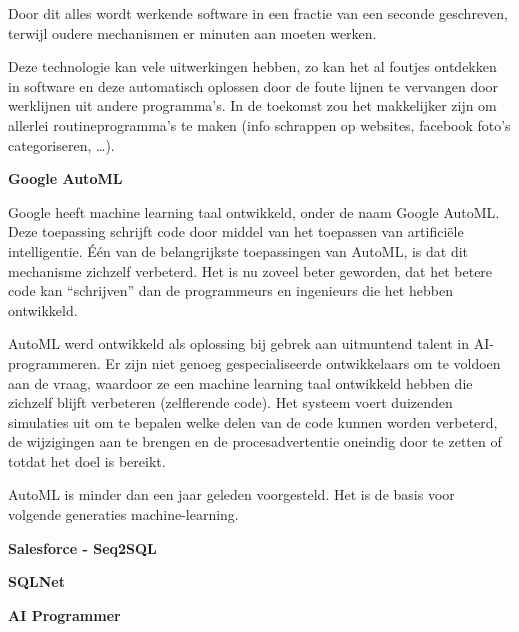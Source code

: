 Door dit alles wordt werkende software in een fractie van een seconde geschreven, terwijl oudere mechanismen er minuten aan moeten werken.

Deze technologie kan vele uitwerkingen hebben, zo kan het al foutjes ontdekken in software en deze automatisch oplossen door de foute lijnen te vervangen door werklijnen uit andere programma’s. In de toekomst zou het makkelijker zijn om allerlei routineprogramma’s te maken (info schrappen op websites, facebook foto’s categoriseren, …).

\textbf{Google AutoML}

Google heeft machine learning taal ontwikkeld, onder de naam Google AutoML. Deze toepassing schrijft code door middel van het toepassen van artificiële intelligentie. Één van de belangrijkste toepassingen van AutoML, is dat dit mechanisme zichzelf verbeterd. Het is nu zoveel beter geworden, dat het betere code kan “schrijven” dan de programmeurs en ingenieurs die het hebben ontwikkeld. 

AutoML werd ontwikkeld als oplossing bij gebrek aan uitmuntend talent in AI-programmeren. Er zijn niet genoeg gespecialiseerde ontwikkelaars om te voldoen aan de vraag, waardoor ze een machine learning taal ontwikkeld hebben die zichzelf blijft verbeteren (zelflerende code). Het systeem voert duizenden simulaties uit om te bepalen welke delen van de code kunnen worden verbeterd, de wijzigingen aan te brengen en de procesadvertentie oneindig door te zetten of totdat het doel is bereikt.  

AutoML is minder dan een jaar geleden voorgesteld. Het is de basis voor volgende generaties machine-learning.


\textbf{Salesforce - Seq2SQL}

\textbf{SQLNet}

\textbf{AI Programmer}